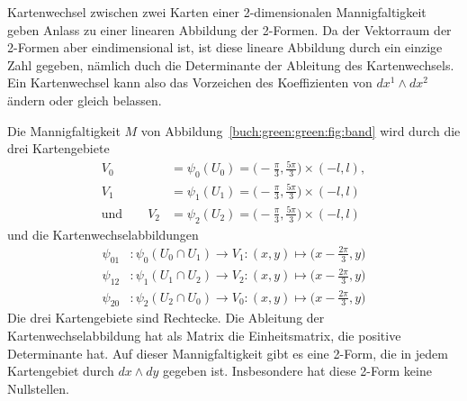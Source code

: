Kartenwechsel zwischen zwei Karten einer 2-dimensionalen Mannigfaltigkeit
geben Anlass zu einer linearen Abbildung der 2-Formen.
Da der Vektorraum der 2-Formen aber eindimensional ist, ist diese
lineare Abbildung durch ein einzige Zahl gegeben, nämlich duch die
Determinante der Ableitung des Kartenwechsels.
Ein Kartenwechsel kann also das Vorzeichen des Koeffizienten
von $dx^1\wedge dx^2$ ändern oder gleich belassen.

\begin{beispiel}
\label{buch:green:green:beispiel:band}

Die Mannigfaltigkeit $M$ von Abbildung~\ref{buch:green:green:fig:band}
wird durch die drei Kartengebiete
\begin{align*}
V_0&=\psi_0(U_0) = \biggl(-\frac{\pi}3,\frac{5\pi}3\biggr)\times(-l,l),
\\
V_1&=\psi_1(U_1) = \biggl(-\frac{\pi}3,\frac{5\pi}3\biggr)\times(-l,l)
\\
\text{und}\qquad
V_2&=\psi_2(U_2) = \biggl(-\frac{\pi}3,\frac{5\pi}3\biggr)\times(-l,l)
\end{align*}
und die Kartenwechselabbildungen
\begin{align*}
\psi_{01}&\colon
\psi_0(U_0\cap U_1)
\to
V_1
:(x,y) \mapsto \biggl(x-\frac{2\pi}3,y\biggr)
\\
\psi_{12}&\colon
\psi_1(U_1\cap U_2)
\to
V_2
:(x,y) \mapsto \biggl(x-\frac{2\pi}3,y\biggr)
\\
\psi_{20}&\colon
\psi_2(U_2\cap U_0)
\to
V_0
:(x,y) \mapsto \biggl(x-\frac{2\pi}3,y\biggr)
\end{align*}
Die drei Kartengebiete sind Rechtecke.
Die Ableitung der Kartenwechselabbildung hat als Matrix die Einheitsmatrix,
die positive Determinante hat.
Auf dieser Mannigfaltigkeit gibt es eine 2-Form, die in jedem 
Kartengebiet durch $dx\wedge dy$ gegeben ist.
Insbesondere hat diese 2-Form keine Nullstellen.
\end{beispiel}


